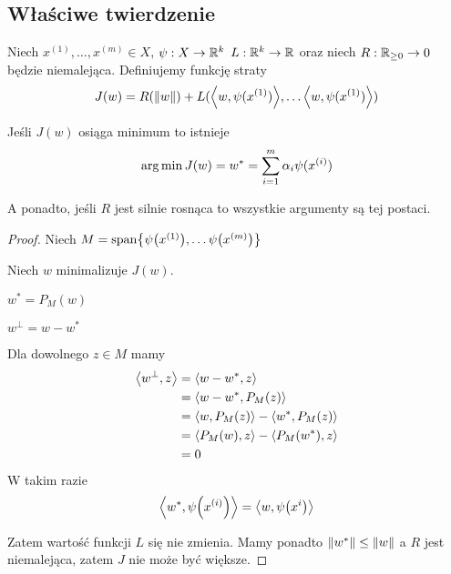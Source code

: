 \subsection{Właściwe twierdzenie}
\begin{theorem}[O reprezentacji]
	Niech \( x^{(1)}, \dots, x^{(m)} \in X \), \( \psi : X \rightarrow \mathbb{R}^k \)
	\( L : \mathbb{R}^k \rightarrow \mathbb{R} \) oraz niech \( R : \mathbb{R}_{\geq 0} \rightarrow 0 \) będzie niemalejąca.
	Definiujemy funkcję straty
	\[
		J(w) = R(\norm{w}) + L(\dotproduct{w, \psi(x^{(1)})}, \dots \dotproduct{w, \psi(x^{(1)})})
	\]

	Jeśli \( J(w) \) osiąga minimum to istnieje
	\[
		\operatorname*{arg\,min} J(w) = w^* = \sum_{i=1}^m \alpha_i \psi(x^{(i)})
	\]

	A ponadto, jeśli \( R \) jest silnie rosnąca to wszystkie argumenty są tej postaci.

\end{theorem}
\begin{proof}
	Niech \( M = \text{span} \set{\psi\pars{x^{(1)}}, \dots \psi\pars{x^{(m)}}} \)

	Niech \( w \) minimalizuje \( J(w) \).

	\( w^* = P_M(w) \)

	\( w^\perp = w - w^* \)

	Dla dowolnego \( z \in M \) mamy
	\begin{align*}
		\left\langle w^\perp, z\right\rangle
		 & = \left\langle w - w^*, z\right\rangle                           \\
		 & = \left\langle w - w^*, P_M(z)\right\rangle                      \\
		 & = \left\langle w, P_M(z)\right\rangle - \left\langle w^*, P_M(z)\right\rangle \\
		 & = \left\langle P_M(w), z\right\rangle - \left\langle P_M(w^*), z\right\rangle \\
		 & = 0
	\end{align*}
	W takim razie
	\[
		\dotproduct{w^*, \psi\pars{x^{(i)}}}
		=
		\dotproduct{w, \psi\pars{x^{i}}}
	\]

	Zatem wartość funkcji \( L \) się nie zmienia.
	Mamy ponadto \( \left\Vert w^* \right\Vert \leq \left\Vert w \right\Vert \) a \( R \) jest niemalejąca, zatem \( J \) nie może być większe.
\end{proof}